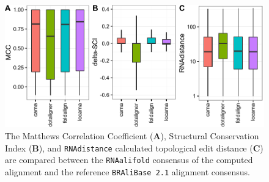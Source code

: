 \documentclass{bmcart}
\newcommand\bralibase{\texttt{BRAliBase 2.1}}
\newcommand\rnaalifold{\texttt{RNAalifold}}
\begin{document}
\begin{backmatter}
\begin{figure}[h!]
 \includegraphics[width=\textwidth]{fig2}
 \caption {  The
 Matthews Correlation Coefficient (\textbf{A}), Structural Conservation Index  
 (\textbf{B}), and \texttt{RNAdistance} calculated topological edit distance 
 (\textbf{C}) are compared between the \rnaalifold{} consensus of the computed 
 alignment and the reference \bralibase{} alignment consensus.  }
\end{figure}



\end{backmatter}
\end{document}
